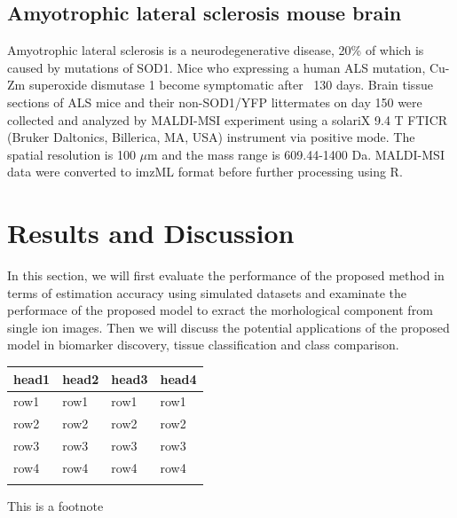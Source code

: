 \documentclass{bioinfo}
\begin{document}
\subsection{Amyotrophic lateral sclerosis mouse brain}
Amyotrophic lateral sclerosis is a neurodegenerative disease, 20\% of which is caused by mutations of SOD1. Mice who expressing a human ALS mutation, Cu-Zm superoxide dismutase 1 become symptomatic after ~130 days. Brain tissue sections of ALS mice and their non-SOD1/YFP littermates on day 150 were collected and analyzed by MALDI-MSI experiment using a solariX 9.4 T FTICR
(Bruker Daltonics, Billerica, MA, USA) instrument via positive mode. The spatial resolution is 100 $\mu$m and the mass range is 609.44-1400 Da. MALDI-MSI data were converted to imzML format before further processing using R.













\section{Results and Discussion}
In this section, we will first evaluate the performance of the proposed method in terms of estimation accuracy using simulated datasets and examinate the performace of the proposed model to exract the morhological component from single ion images. Then we will discuss the potential applications of the proposed model in biomarker discovery, tissue classification and class comparison.







\begin{table}[!t]
 {\begin{tabular}{@{}llll@{}}\toprule head1 &
head2 & head3 & head4\\\midrule
row1 & row1 & row1 & row1\\
row2 & row2 & row2 & row2\\
row3 & row3 & row3 & row3\\
row4 & row4 & row4 & row4\\\botrule
\end{tabular}}{This is a footnote}
\end{table}
\end{document}
